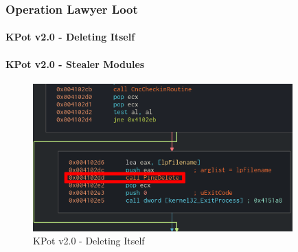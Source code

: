 \documentclass[aspectratio=169]{beamer}
\begin{document}
{
\begin{frame}
  \frametitle{Operation Lawyer Loot}
  \framesubtitle{KPot v2.0 - Deleting Itself}
  \framesubtitle{KPot v2.0 - Stealer Modules}
  \begin{figure}
    \includegraphics[width=10cm]{kpot-ping-delete-0}
    \caption{KPot v2.0 - Deleting Itself}
  \end{figure}
\end{frame}
}
\end{document}
